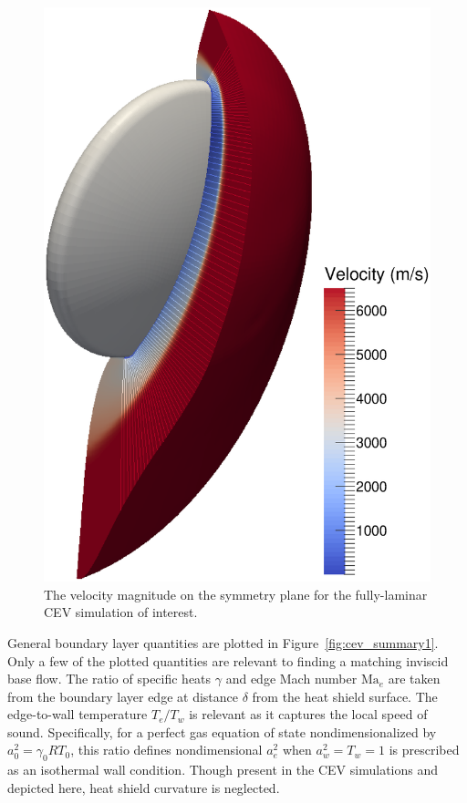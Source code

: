 \documentclass[letterpaper,11pt,nointlimits,reqno]{amsart}
\newcommand{\Mach}[1][]{\ensuremath{\mbox{Ma}_{#1}}}
\begin{document}
\begin{figure}
  \centering
  \includegraphics[height=0.55\textheight]{symplanenorm}
  \caption{
    \label{fig:cev_symplane}
    The velocity magnitude on the symmetry plane for the fully-laminar
    CEV simulation of interest.
  }
\end{figure}

General boundary layer quantities are plotted in Figure~\ref{fig:cev_summary1}.
Only a few of the plotted quantities are relevant to finding a matching
inviscid base flow.  The ratio of specific heats $\gamma$ and edge Mach number
$\Mach[e]{}$ are taken from the boundary layer edge at distance $\delta$ from
the heat shield surface.  The edge-to-wall temperature $T_e/T_w$ is relevant as
it captures the local speed of sound.  Specifically, for a perfect gas equation
of state nondimensionalized by $a_0^2=\gamma_{0}RT_0$, this ratio defines
nondimensional $a_e^2$ when $a_w^2=T_w=1$ is prescribed as an isothermal wall
condition.  Though present in the CEV simulations and depicted here, heat
shield curvature is neglected.
\end{document}
